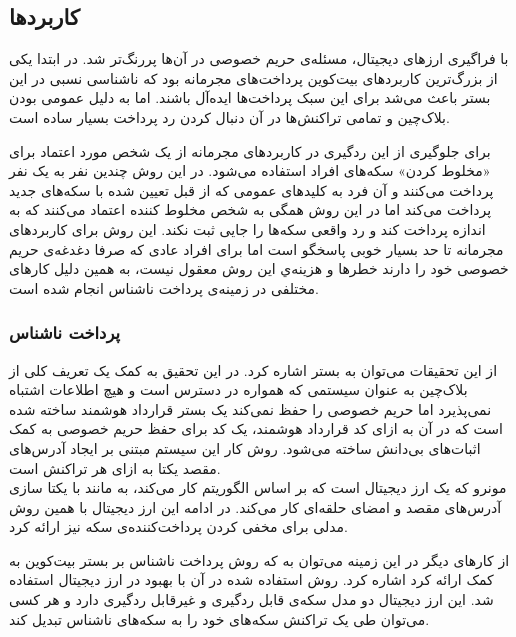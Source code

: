 \subsection{کاربرد‌ها}
با فراگیری ارز‌های دیجیتال، مسئله‌ی حریم خصوصی در آن‌ها پررنگ‌تر شد. در ابتدا یکی از بزرگ‌ترین کاربردهای بیت‌کوین پرداخت‌های مجرمانه بود که ناشناسی نسبی در این بستر باعث می‌شد برای این سبک‌ پرداخت‌ها ایده‌آل باشند. اما به دلیل عمومی بودن بلاک‌چین و تمامی تراکنش‌ها در آن دنبال کردن رد پرداخت بسیار ساده است.
\par
 برای جلوگیری از این ردگیری در کاربردهای مجرمانه از یک شخص مورد اعتماد برای «مخلوط کردن» سکه‌های افراد استفاده می‌شود. در این روش چندین نفر به یک نفر پرداخت می‌کنند و آن فرد به کلید‌های عمومی که از قبل تعیین شده با سکه‌های جدید پرداخت می‌کند اما در این روش همگی به شخص مخلوط کننده اعتماد می‌کنند که به اندازه پرداخت کند و رد واقعی سکه‌ها را جایی ثبت نکند. این روش برای کاربردهای مجرمانه تا حد بسیار خوبی پاسخگو است اما برای افراد عادی که صرفا دغدغه‌ی حریم خصوصی خود را دارند خطرها و هزینه‌ي این روش معقول نیست، به همین دلیل کارهای مختلفی در زمینه‌ی پرداخت ناشناس انجام شده است. 
 
\subsubsection{پرداخت ناشناس}
از این تحقیقات می‌توان به بستر 
\cite{hawk}
اشاره کرد. در این تحقیق به کمک یک تعریف کلی از بلاک‌چین به عنوان سیستمی که همواره در دسترس است و هیچ اطلاعات اشتباه نمی‌پذیرد اما حریم خصوصی را حفظ نمی‌کند یک بستر قرارداد هوشمند ساخته شده است که در آن به ازای کد قرارداد هوشمند، یک کد برای حفظ حریم خصوصی به کمک اثبات‌های بی‌دانش ساخته می‌شود. روش کار این سیستم مبتنی بر ایجاد آدرس‌های مقصد یکتا به ازای هر تراکنش است. 
\\
مونرو 
که یک ارز دیجیتال است که بر اساس الگوریتم 
\cite{monero}
کار می‌کند، به مانند 
با یکتا سازی آدرس‌های مقصد و امضای حلقه‌ای 
کار می‌کند. در ادامه این ارز دیجیتال با همین روش مدلی 
\cite{monero2}
برای مخفی کردن پرداخت‌کننده‌ی سکه نیز ارائه کرد.
\par
از کارهای دیگر در این زمینه‌ می‌توان به 
\cite{zerocoin}
که روش پرداخت ناشناس بر بستر بیت‌کوین به کمک 
ارائه کرد اشاره کرد. روش استفاده شده در آن با بهبود در ارز دیجیتال 
\cite{zerocash}
استفاده شد. این ارز دیجیتال دو مدل سکه‌ی قابل ردگیری و غیرقابل ردگیری دارد و هر کسی می‌توان طی یک تراکنش سکه‌های خود را به سکه‌های ناشناس تبدیل کند.


